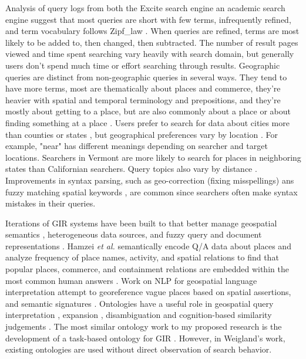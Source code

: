 Analysis of query logs from both the Excite search engine an academic search engine suggest that most queries are short with few terms, infrequently refined, and term vocabulary follows \gls{Zipf_law} \cite{Spink2001} \cite{Spink2002} \cite{Wang2003} \cite{Han2014}. When queries are refined, terms are most likely to be added to, then changed, then subtracted. The number of result pages viewed and time spent searching vary heavily with search domain, but generally users don't spend much time or effort searching through results.  Geographic queries are distinct from non-geographic queries in several ways. They tend to have more terms, most are thematically about places and commerce, they're heavier with spatial and temporal terminology and prepositions, and they're mostly about getting to a place, but are also commonly about a place or about finding something at a place \cite{Sanderson2007} \cite{Kohler2003} \cite{Henrich2007}. Users prefer to search for data about cities more than counties or states \cite{Hamzei2019a}, but geographical preferences vary by location \cite{Jones2008a}. For example, "near" has different meanings depending on searcher and target locations. Searchers in Vermont are more likely to search for places in neighboring states than Californian searchers. Query topics also vary by distance \cite{Xiao2010}. Improvements in syntax parsing, such as geo-correction (fixing misspellings) \cite{Alsubaiee2009} ans fuzzy matching spatial keywords \cite{Zhang2017}, are common since searchers often make syntax mistakes in their queries.

Iterations of GIR systems have been built to that better manage geospatial semantics \cite{Jones2004} \cite{Jones2002}, heterogeneous data sources\cite{Hu2007}, and fuzzy query and document representations \cite{Bordogna2012}. Hamzei \emph{et al.} semantically encode \acrshort{Q/A} data about places and analyze frequency of place names, activity, and spatial relations to find that popular places, commerce, and containment relations are embedded within the most common human answers \cite{Hamzei2019b}. Work on NLP for geospatial language interpretation attempt to georeference vague places based on spatial assertions, and semantic signatures \cite{Guo2008} \cite{Liu2009} \cite{Li2012} \cite{Gao2017}. Ontologies have a useful role in geospatial query interpretation \cite{Mauro2017}, expansion \cite{Fu2005}, disambiguation \cite{Jones2003} and cognition-based similarity judgements \cite{Schwering2009}. The most similar ontology work to my proposed research is the development of a task-based ontology for GIR \cite{Wiegand2007}. However, in Weigland's work, existing ontologies are used without direct observation of search behavior.

